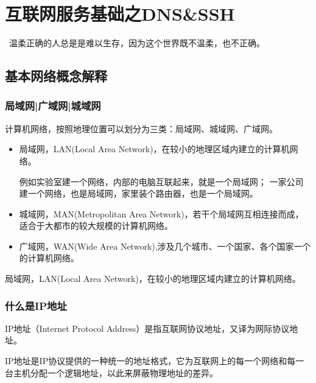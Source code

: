 \chapter{互联网服务基础之DNS\&SSH}
\begin{center}{\textcolor[RGB]{255, 0, 0}{\faHeart}~温柔正确的人总是是难以生存，因为这个世界既不温柔，也不正确。~\textcolor[RGB]{255, 0, 0}{\faHeart}}
\end{center}
\begin{center}
\end{center}
\section{基本网络概念解释}
\subsection{局域网|广域网|城域网}
计算机网络，按照地理位置可以划分为三类：局域网、城域网、广域网。
\begin{itemize}
	\item 局域网，LAN(Local Area Network)，在较小的地理区域内建立的计算机网络。
	
	例如实验室建一个网络，内部的电脑互联起来，就是一个局域网；
	一家公司建一个网络，也是局域网，家里装个路由器，也是一个局域网。
	\item 城域网，MAN(Metropolitan Area Network)，若干个局域网互相连接而成，适合于大都市的较大规模的计算机网络。
	\item 广域网，WAN(Wide Area Network),涉及几个城市、一个国家、各个国家一个的计算机网络。
	
\end{itemize}
局域网，LAN(Local Area Network)，在较小的地理区域内建立的计算机网络。
\subsection{什么是IP地址}
IP地址（Internet Protocol Address）是指互联网协议地址，又译为网际协议地址。

IP地址是IP协议提供的一种统一的地址格式，它为互联网上的每一个网络和每一台主机分配一个逻辑地址，以此来屏蔽物理地址的差异。

